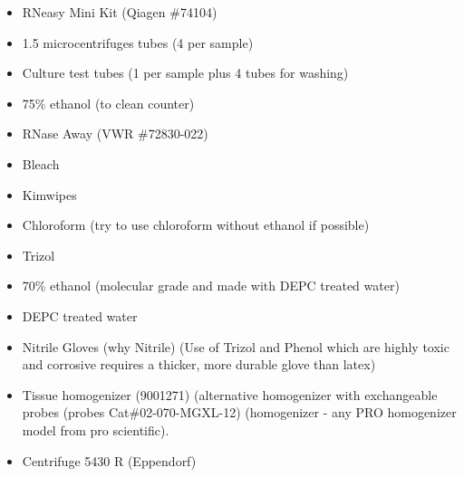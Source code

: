 \documentclass[11pt, oneside]{article}
\begin{document}
		\begin{itemize}
			\itemsep0em
			\item RNeasy Mini Kit (Qiagen \#74104)		
			\item 1.5 microcentrifuges tubes (4 per sample)	
			\item Culture test tubes (1 per sample plus 4 tubes for washing) 
			\item 75\% ethanol (to clean counter) 
			\item RNase Away (VWR \#72830-022)
			\item Bleach
			\item Kimwipes 
			\item Chloroform (try to use chloroform without ethanol if possible)
			\item Trizol
			\item 70\% ethanol (molecular grade and made with DEPC treated water)
			\item DEPC treated water
			\item Nitrile Gloves (why Nitrile) (Use of Trizol and Phenol which are highly toxic and corrosive requires a thicker, more durable glove than 			latex) 
 		\end{itemize}

			
			\begin{itemize}
				\itemsep0mm
				\item Tissue homogenizer (9001271) (alternative homogenizer with exchangeable probes (probes Cat\#02-070-MGXL-12) (homogenizer 				- any PRO homogenizer model from pro scientific). 
				\item Centrifuge 5430 R (Eppendorf)
			\end{itemize}
		
		\vspace{5mm}
		
				
\end{document}
